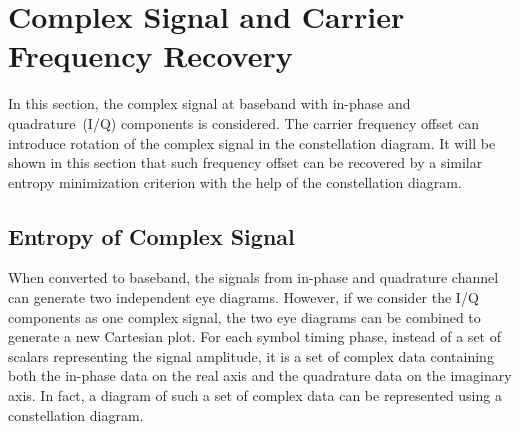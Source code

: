 \documentclass[journal,comsoc]{IEEEtran}
\begin{document}
\section{Complex Signal and Carrier Frequency Recovery}
\label{sec:carrier}


In this section, the complex signal at baseband with in-phase and quadrature~(I/Q) components is considered.
The carrier frequency offset can introduce rotation of the complex signal in the constellation diagram.
It will be shown in this section that such frequency offset can be recovered by a similar entropy minimization criterion with the help of the constellation diagram.
\subsection{Entropy of Complex Signal}
When converted to baseband, the signals from in-phase and quadrature channel can generate two independent eye diagrams.
However, if we consider the I/Q components as one complex signal, the two eye diagrams can be combined to generate a new Cartesian plot.
For each symbol timing phase, instead of a set of scalars representing the signal amplitude, it is a set of complex data containing both the in-phase data on the real axis and the quadrature data on the imaginary axis.
In fact, a diagram of such a set of complex data can be represented using a constellation diagram.
\end{document}
